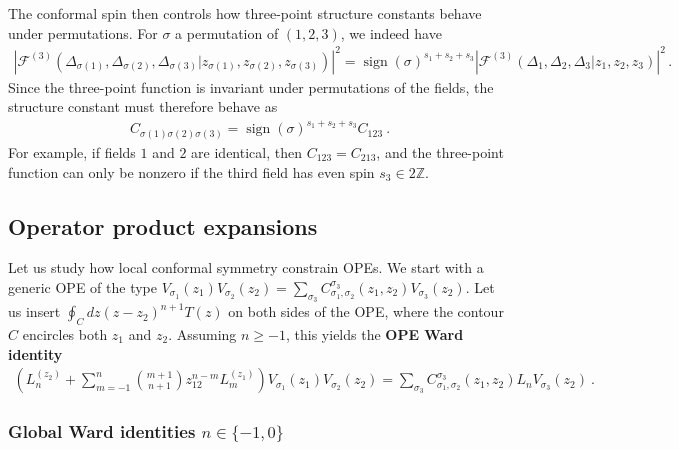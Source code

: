 \documentclass[12pt, a4paper, notitlepage, twoside]{report}
\numberwithin{equation}{section}
\theoremstyle{break}
\begin{document}
The conformal spin then controls how three-point structure constants behave under permutations. For $\sigma$ a permutation of $(1,2,3)$, we indeed have 
\begin{align}
 \left|\mathcal{F}^{(3)}(\Delta_{\sigma(1)},\Delta_{\sigma(2)},\Delta_{\sigma(3)}|z_{\sigma(1)},z_{\sigma(2)},z_{\sigma(3)})\right|^2 = \operatorname{sign}(\sigma)^{s_1+s_2+s_3} \left|\mathcal{F}^{(3)}(\Delta_1,\Delta_2,\Delta_3|z_1,z_2,z_3)\right|^2\, .
\end{align}
Since the three-point function is invariant under permutations of the fields, the structure constant must therefore behave as 
\begin{align}
 \boxed{ C_{\sigma(1)\sigma(2)\sigma(3)} = \operatorname{sign}(\sigma)^{s_1+s_2+s_3} C_{123} }\ .
 \label{css}
\end{align}
For example, if fields $1$ and $2$ are identical, then $C_{123}=C_{213}$, and the three-point function can only be nonzero if the third field has even spin $s_3\in 2\mathbb{Z}$.


\subsection{Operator product expansions \label{secope}}

Let us study how local conformal symmetry constrain OPEs. We start with a generic OPE of the type $V_{\sigma_1}(z_1)V_{\sigma_2}(z_2) = \sum_{\sigma_3} C_{\sigma_1,\sigma_2}^{\sigma_3}(z_1,z_2) V_{\sigma_3}(z_2)$. Let us insert $\oint_C dz (z-z_2)^{n+1} T(z)$ on both sides of the OPE, where the contour $C$ encircles both $z_1$ and $z_2$. Assuming $n\geq -1$, this yields the \textbf{OPE Ward identity}
\begin{align}
 \left(L_n^{(z_2)}+\sum_{m=-1}^{n}\binom{m+1}{n+1} z_{12}^{n-m}L_{m}^{(z_1)}\right)V_{\sigma_1}(z_1)V_{\sigma_2}(z_2) = \sum_{\sigma_3} C_{\sigma_1,\sigma_2}^{\sigma_3}(z_1,z_2) L_n V_{\sigma_3}(z_2)\ .
\end{align}

\subsubsection{Global Ward identities $n\in\{-1,0\}$}
\end{document}
